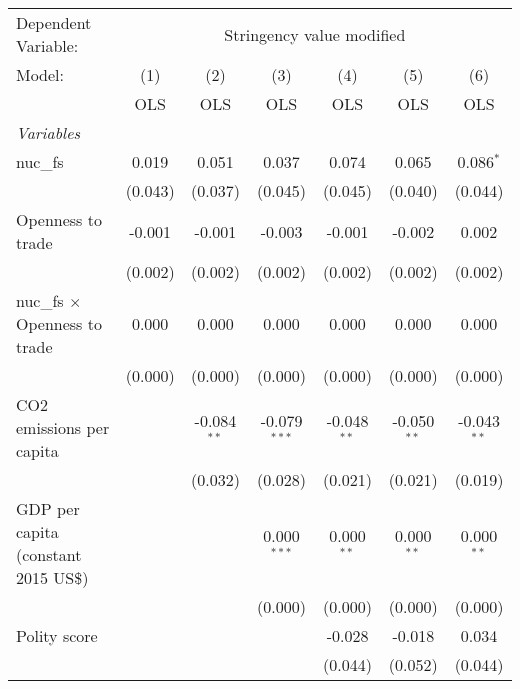 
\begingroup
\centering
\begin{tabular}{lcccccc}
   \toprule
   Dependent Variable: & \multicolumn{6}{c}{Stringency value modified}\\
   Model:                               & (1)     & (2)           & (3)            & (4)           & (5)           & (6)\\  
                                        &  OLS    & OLS           & OLS            & OLS           & OLS           & OLS\\  
   \midrule
   \emph{Variables}\\
   nuc\_fs                              & 0.019   & 0.051         & 0.037          & 0.074         & 0.065         & 0.086$^{*}$\\   
                                        & (0.043) & (0.037)       & (0.045)        & (0.045)       & (0.040)       & (0.044)\\   
   Openness to trade                    & -0.001  & -0.001        & -0.003         & -0.001        & -0.002        & 0.002\\   
                                        & (0.002) & (0.002)       & (0.002)        & (0.002)       & (0.002)       & (0.002)\\   
   nuc\_fs $\times$ Openness to trade   & 0.000   & 0.000         & 0.000          & 0.000         & 0.000         & 0.000\\   
                                        & (0.000) & (0.000)       & (0.000)        & (0.000)       & (0.000)       & (0.000)\\   
   CO2 emissions per capita             &         & -0.084$^{**}$ & -0.079$^{***}$ & -0.048$^{**}$ & -0.050$^{**}$ & -0.043$^{**}$\\   
                                        &         & (0.032)       & (0.028)        & (0.021)       & (0.021)       & (0.019)\\   
   GDP per capita (constant 2015 US\$)  &         &               & 0.000$^{***}$  & 0.000$^{**}$  & 0.000$^{**}$  & 0.000$^{**}$\\   
                                        &         &               & (0.000)        & (0.000)       & (0.000)       & (0.000)\\   
   Polity score                         &         &               &                & -0.028        & -0.018        & 0.034\\   
                                        &         &               &                & (0.044)       & (0.052)       & (0.044)\\   

\end{tabular}
